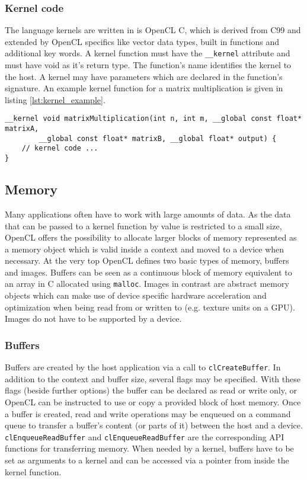 \subsubsection{Kernel code}
The language kernels are written in is OpenCL C, which is derived from C99 and extended by OpenCL specifics like vector data types, built in functions and additional key words. A kernel function must have the \lstinline!__kernel! attribute and must have void as it's return type. The function's name identifies the kernel to the host. A kernel may have parameters which are declared in the function's signature. An example kernel function for a matrix multiplication is given in listing \ref{lst:kernel_example}.

\begin{lstlisting}[caption={An example of a kernel function's signature.},label={lst:kernel_example},language=CL]
__kernel void matrixMultiplication(int n, int m, __global const float* matrixA,
		__global const float* matrixB, __global float* output) {
	// kernel code ...
}
\end{lstlisting}

\subsection{Memory}
Many applications often have to work with large amounts of data. As the data that can be passed to a kernel function by value is restricted to a small size, OpenCL offers the possibility to allocate larger blocks of memory represented as a memory object which is valid inside a context and moved to a device when necessary. At the very top OpenCL defines two basic types of memory, buffers and images. Buffers can be seen as a continuous block of memory equivalent to an array in C allocated using \lstinline!malloc!. Images in contrast are abstract memory objects which can make use of device specific hardware acceleration and optimization when being read from or written to (e.g. texture units on a GPU). Images do not have to be supported by a device. \cite[p.23f]{opencl_book}

\subsubsection{Buffers}
Buffers are created by the host application via a call to \lstinline!clCreateBuffer!. In addition to the context and buffer size, several flags may be specified. With these flags (beside further options) the buffer can be declared as read or write only, or OpenCL can be instructed to use or copy a provided block of host memory. Once a buffer is created, read and write operations may be enqueued on a command queue to transfer a buffer's content (or parts of it) between the host and a device. \lstinline!clEnqueueReadBuffer! and \lstinline!clEnqueueReadBuffer! are the corresponding API functions for transferring memory. When needed by a kernel, buffers have to be set as arguments to a kernel and can be accessed via a pointer from inside the kernel function. \cite[p.24]{opencl_book}

